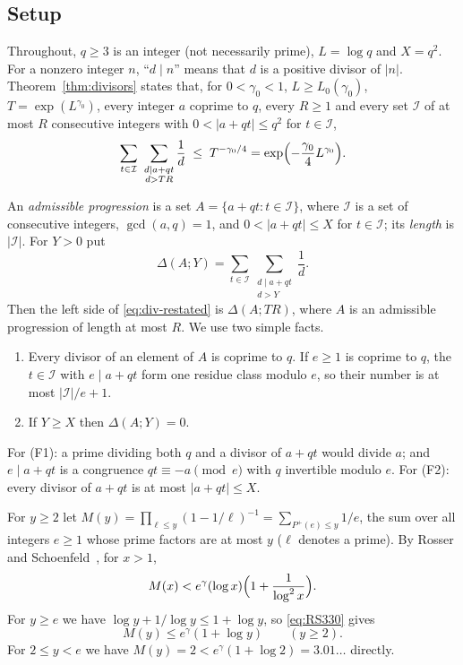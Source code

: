 \subsection{Setup}

Throughout, $q\ge3$ is an integer (not necessarily prime), $L=\log q$ and $X=q^2$. For a nonzero integer $n$, ``$d\mid n$'' means that $d$ is a positive divisor of $|n|$. Theorem~\ref{thm:divisors} states that, for $0<\gamma_0<1$, $L\ge L_0(\gamma_0)$, $T=\exp(L^{\gamma_0})$, every integer $a$ coprime to $q$, every $R\ge1$ and every set $\mathcal I$ of at most $R$ consecutive integers with $0<|a+qt|\le q^2$ for $t\in \mathcal I$,
\begin{equation}\label{eq:div-restated}
\sum_{t\in \mathcal I}\ \sum_{\substack{d\mid a+qt\\ d>TR}}\frac1d\;\le\;T^{-\gamma_0/4}=\exp\Bigl(-\frac{\gamma_0}{4}L^{\gamma_0}\Bigr).
\end{equation}

An \emph{admissible progression} is a set $A=\{a+qt:t\in \mathcal I\}$, where $\mathcal I$ is a set of consecutive integers, $\gcd(a,q)=1$, and $0<|a+qt|\le X$ for $t\in \mathcal I$; its \emph{length} is $|\mathcal I|$. For $Y>0$ put
\[
\Delta(A;Y)=\sum_{t\in \mathcal I}\sum_{\substack{d\mid a+qt\\ d>Y}}\frac1d .
\]
Then the left side of \eqref{eq:div-restated} is $\Delta(A;TR)$, where $A$ is an admissible progression of length at most $R$. We use two simple facts.
\begin{enumerate}[label=(F\arabic*),leftmargin=*]
\item Every divisor of an element of $A$ is coprime to $q$. If $e\ge1$ is coprime to $q$, the $t\in \mathcal I$ with $e\mid a+qt$ form one residue class modulo $e$, so their number is at most $|\mathcal I|/e+1$.
\item If $Y\ge X$ then $\Delta(A;Y)=0$.
\end{enumerate}
For (F1): a prime dividing both $q$ and a divisor of $a+qt$ would divide $a$; and $e\mid a+qt$ is a congruence $qt\equiv-a\pmod e$ with $q$ invertible modulo $e$. For (F2): every divisor of $a+qt$ is at most $|a+qt|\le X$.

For $y\ge2$ let $M(y)=\prod_{\ell\le y}(1-1/\ell)^{-1}=\sum_{P^+(e)\le y}1/e$, the sum over all integers $e\ge1$ whose prime factors are at most $y$ ($\ell$ denotes a prime). By Rosser and Schoenfeld~\cite[(3.30)]{b23}, for $x>1$,
\begin{equation}\label{eq:RS330}
M(x)<e^\gamma(\log x)\Bigl(1+\frac1{\log^2x}\Bigr).
\end{equation}
For $y\ge e$ we have $\log y+1/\log y\le1+\log y$, so \eqref{eq:RS330} gives
\begin{equation}\label{eq:Mertens}
M(y)\le e^\gamma(1+\log y)\qquad(y\ge2).
\end{equation}
For $2\le y<e$ we have $M(y)=2<e^\gamma(1+\log2)=3.01\ldots$ directly.

